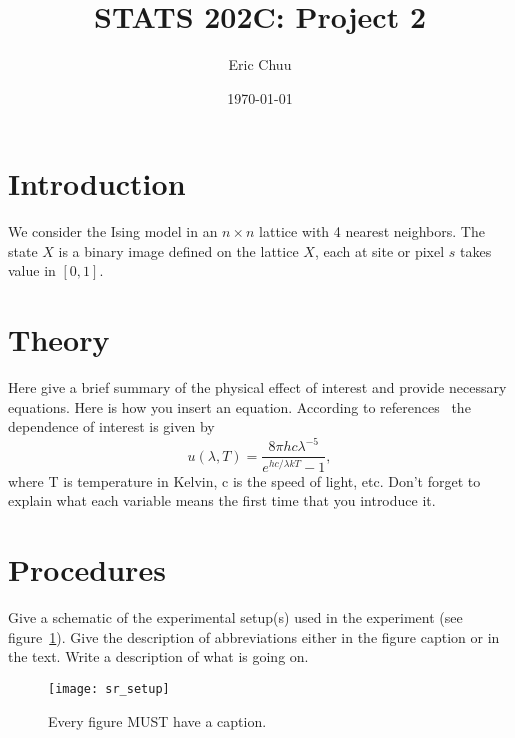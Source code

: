 \documentclass[letterpaper,12pt]{article}
\begin{document}
\title{STATS 202C: Project 2}
\author{Eric Chuu}
\date{\today}
\maketitle


\section{Introduction}

We consider the Ising model in an $n \times n$ lattice with 4 nearest neighbors. The state $X$ is a binary image defined on the lattice $X$, each at site or pixel $s$ takes value in $[0,1]$.


\section{Theory}

Here give a brief summary of the physical effect of interest and provide
necessary equations. Here is how you insert an equation. According to
references~\cite{melissinos, Cyr, Wiki} the dependence of interest is given
by
\begin{equation} \label{eq:aperp} %
u(\lambda,T)=\frac{8\pi hc\lambda^{-5}}{e^{hc/\lambda kT}-1},
\end{equation}
where T is temperature in Kelvin, c is the speed of light, etc. Don't forget to
explain what each variable means the first time that you introduce it.


\section{Procedures}

Give a schematic of the experimental setup(s) used in the experiment (see
figure~\ref{fig:samplesetup}). Give the description of  abbreviations
either in the figure caption or in the text. Write a description of what is
going on. 

\begin{figure}[ht] 
        \centering \texttt{[image: sr\_setup]}
        \caption{
                \label{fig:samplesetup} %
                Every figure MUST have a caption.
        }
\end{figure}
\end{document}
